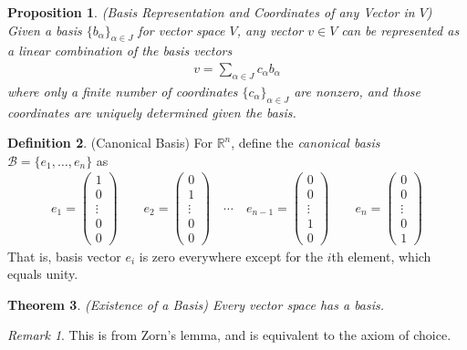 \documentclass[12pt]{book}
\numberwithin{equation}{section} %
\theoremstyle{plain}
\newtheorem{thm}{Theorem}[section]
\newtheorem{prop}[thm]{Proposition}
\theoremstyle{definition}
\newtheorem{defn}[thm]{Definition}
\theoremstyle{remark}
\newtheorem*{rmk}{Remark}
\newcommand{\Rn}{\mathbb{R}^n}
\begin{document}
\begin{prop}
\emph{(Basis Representation and Coordinates of any Vector in $V$)}
Given a basis $\{b_\alpha\}_{\alpha\in J}$ for vector space $V$, any
vector $v\in V$ can be represented as a linear combination of
the basis vectors
\begin{align}
  v = \sum_{\alpha\in J} c_\alpha b_\alpha
  \label{defn:basis}
\end{align}
where only a {finite} number of coordinates
$\{c_\alpha\}_{\alpha\in J}$ are nonzero, and those coordinates are
uniquely determined given the basis.
\end{prop}


\begin{defn}{(Canonical Basis)}
For $\Rn$, define the \emph{canonical basis}
$\mathcal{B}=\{e_1,\ldots,e_n\}$ as
\begin{align*}
  e_1 =
  \begin{pmatrix}
  1 \\ 0 \\ \vdots \\ 0 \\ 0
  \end{pmatrix}
  \qquad
  e_2 =
  \begin{pmatrix}
  0 \\ 1 \\ \vdots \\ 0 \\ 0
  \end{pmatrix}
  \quad \cdots \quad
  e_{n-1} =
  \begin{pmatrix}
  0 \\ 0 \\ \vdots \\ 1 \\ 0
  \end{pmatrix}
  \qquad
  e_n =
  \begin{pmatrix}
  0 \\ 0 \\ \vdots \\ 0 \\ 1
  \end{pmatrix}
\end{align*}
That is, basis vector $e_i$ is zero everywhere except for the $i$th
element, which equals unity.
\end{defn}



\begin{thm}\emph{(Existence of a Basis)}
Every vector space has a basis.
\end{thm}
\begin{rmk}
This is from Zorn's lemma, and is equivalent to the axiom of choice.
\end{rmk}
\end{document}
